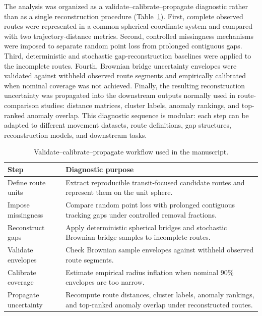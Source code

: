 \documentclass[pdflatex,sn-vancouver-num]{sn-jnl}
\begin{document}
The analysis was organized as a validate--calibrate--propagate diagnostic rather than as a single reconstruction procedure (Table~\ref{tab:diagnostic-workflow}). First, complete observed routes were represented in a common spherical coordinate system and compared with two trajectory-distance metrics. Second, controlled missingness mechanisms were imposed to separate random point loss from prolonged contiguous gaps. Third, deterministic and stochastic gap-reconstruction baselines were applied to the incomplete routes. Fourth, Brownian bridge uncertainty envelopes were validated against withheld observed route segments and empirically calibrated when nominal coverage was not achieved. Finally, the resulting reconstruction uncertainty was propagated into the downstream outputs normally used in route-comparison studies: distance matrices, cluster labels, anomaly rankings, and top-ranked anomaly overlap. This diagnostic sequence is modular: each step can be adapted to different movement datasets, route definitions, gap structures, reconstruction models, and downstream tasks.

\begin{table}[t]
\centering
\caption{Validate--calibrate--propagate workflow used in the manuscript.}
\label{tab:diagnostic-workflow}
\small
\begin{tabular}{p{}p{}}
\toprule
Step & Diagnostic purpose \\
\midrule
Define route units & Extract reproducible transit-focused candidate routes and represent them on the unit sphere. \\
Impose missingness & Compare random point loss with prolonged contiguous tracking gaps under controlled removal fractions. \\
Reconstruct gaps & Apply deterministic spherical bridges and stochastic Brownian bridge samples to incomplete routes. \\
Validate envelopes & Check Brownian sample envelopes against withheld observed route segments. \\
Calibrate coverage & Estimate empirical radius inflation when nominal 90\% envelopes are too narrow. \\
Propagate uncertainty & Recompute route distances, cluster labels, anomaly rankings, and top-ranked anomaly overlap under reconstructed routes. \\
\bottomrule
\end{tabular}
\end{table}
\end{document}
